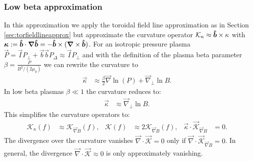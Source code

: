 \subsubsection{Low beta approximation}\label{sec:lowbetaapprox}
In this approximation we apply the toroidal field line approximation
as in Section
\ref{sec:torfieldlineapprox}
but approximate the curvature operator $\mathcal K_\kappa \approx \bm{\hat{b}}\times\kappa$
  with
  ${\boldsymbol{\kappa}} := \bm{\hat{b}} \cdot {\boldsymbol{\nabla}}\bm{\hat{b}} = -\bm{\hat{b}} \times({\boldsymbol{\nabla}}\times \bm{\hat{b}})$.
For an isotropic pressure plasma \(\vec{P} = \vec{I} P_\perp + \vec{b} \vec{b} P_\Delta \approx \vec{I} P_\perp\) and with the definition of the plasma beta parameter
\(\beta = \frac{P}{B^2/(2 \mu_0) } \)
we can rewrite the curvature to
\begin{align}
 \vec{\kappa} &\approx \frac{\beta}{2} \vec{\nabla} \ln(P) +\vec{\nabla}_\perp \ln{B} .
\end{align}
In low beta plasmas \(\beta\ll1\) the curvature reduces to:
\begin{align}
 \vec{\kappa} & \approx \vec{\nabla}_\perp \ln{B} .
\end{align}
This simplifies the curvature operators to:
\begin{align}
\mathcal{K}_{\kappa}(f)   &\approx  \mathcal{K}_{\vec{\nabla}  B}(f),  &
\mathcal{K} (f) &\approx 2\mathcal{K}_{\vec{\nabla}  B} (f) , &
 \vec{\kappa} \cdot \vec{\mathcal{K}}_{\vec{\nabla}  B} &= 0.
\end{align}
The divergence over the curvature vanishes \( \vec{\nabla} \cdot \vec{ \mathcal{K} } = 0\) only if \( \vec{\nabla} \cdot \vec{ \mathcal{K}}_{\vec{\nabla}  B}   = 0\).
In general, the divergence \( \vec{\nabla} \cdot \vec{ \mathcal{K} } \approx 0\) is only approximately vanishing.
